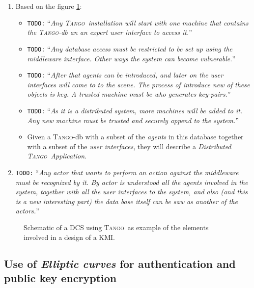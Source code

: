 \documentclass[10pt,a4paper,twoside]{llncs}
\newcommand{\todo}[1]{\texttt{\color{red}TODO:} ``\emph{#1}''}
\newcommand{\tango}{\textsc{Tango}}
\begin{document}
\begin{enumerate}
    \item Based on the figure \ref{fig:DistribKMI}:
    \begin{itemize}
        \item \todo{Any \tango\, installation will start with one machine that contains the \tango-db an an expert \emph{user interface} to access it.}
        \item \todo{Any database access must be restricted to be set up using the \emph{middleware interface}. Other ways the system can become vulnerable.}
        \item \todo{After that \emph{agents} can be introduced, and later on the \emph{user interfaces} will come to to the scene. The process of introduce new of these objects is key. A trusted machine must be who generates key-pairs.}
        \item \todo{As it is a distributed system, more machines will be added to it. Any new machine must be trusted and securely append to the system.}
        \item Given a \tango-db with a subset of the \emph{agents} in this database together with a subset of the \emph{user interfaces}, they will describe a \emph{Distributed \tango\, Application}.
    \end{itemize}

    \item \todo{Any \emph{actor} that wants to perform an action against the \emph{middleware} must be recognized by it. By \emph{actor} is understood all the agents involved in the system, together with all the user interfaces to the system, and also (and this is a new interesting part) the data base itself can be saw as another of the \emph{actors}.}
\end{enumerate}

\begin{figure}[ht]
\begin{center}
 \scalebox{0.65}{}
 \caption{Schematic of a DCS using \tango\, as example of the elements involved in a design of a KMI.}
 \label{fig:DistribKMI}
\end{center}
\end{figure}

\subsection{Use of \emph{Elliptic curves} for authentication and public key encryption}\label{sec:authentication}
\end{document}
